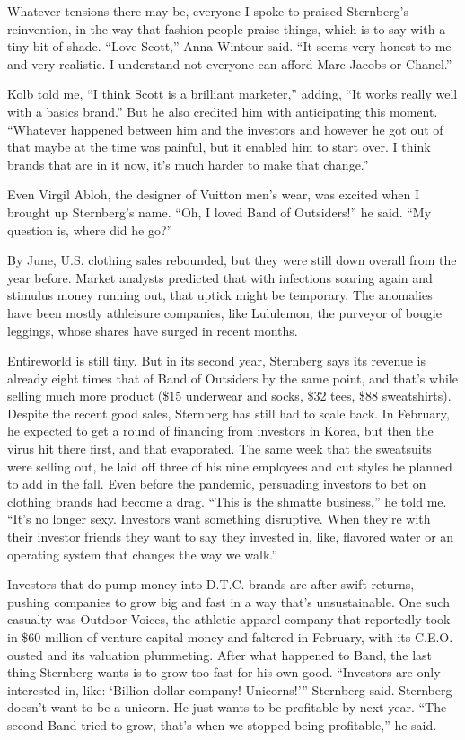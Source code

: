 Whatever tensions there may be, everyone I spoke to praised Sternberg's
reinvention, in the way that fashion people praise things, which is to
say with a tiny bit of shade. ``Love Scott,'' Anna Wintour said. ``It
seems very honest to me and very realistic. I understand not everyone
can afford Marc Jacobs or Chanel.''

Kolb told me, ``I think Scott is a brilliant marketer,'' adding, ``It
works really well with a basics brand.'' But he also credited him with
anticipating this moment. ``Whatever happened between him and the
investors and however he got out of that maybe at the time was painful,
but it enabled him to start over. I think brands that are in it now,
it's much harder to make that change.''

Even Virgil Abloh, the designer of Vuitton men's wear, was excited when
I brought up Sternberg's name. ``Oh, I loved Band of Outsiders!'' he
said. ``My question is, where did he go?''

By June, U.S. clothing sales rebounded, but they were still down overall
from the year before. Market analysts predicted that with infections
soaring again and stimulus money running out, that uptick might be
temporary. The anomalies have been mostly athleisure companies, like
Lululemon, the purveyor of bougie leggings, whose shares have surged in
recent months.

Entireworld is still tiny. But in its second year, Sternberg says its
revenue is already eight times that of Band of Outsiders by the same
point, and that's while selling much more product (\$15 underwear and
socks, \$32 tees, \$88 sweatshirts). Despite the recent good sales,
Sternberg has still had to scale back. In February, he expected to get a
round of financing from investors in Korea, but then the virus hit there
first, and that evaporated. The same week that the sweatsuits were
selling out, he laid off three of his nine employees and cut styles he
planned to add in the fall. Even before the pandemic, persuading
investors to bet on clothing brands had become a drag. ``This is the
shmatte business,'' he told me. ``It's no longer sexy. Investors want
something disruptive. When they're with their investor friends they want
to say they invested in, like, flavored water or an operating system
that changes the way we walk.''

Investors that do pump money into D.T.C. brands are after swift returns,
pushing companies to grow big and fast in a way that's unsustainable.
One such casualty was Outdoor Voices, the athletic-apparel company that
reportedly took in \$60 million of venture-capital money and faltered in
February, with its C.E.O. ousted and its valuation plummeting. After
what happened to Band, the last thing Sternberg wants is to grow too
fast for his own good. ``Investors are only interested in, like:
`Billion-dollar company! Unicorns!''' Sternberg said. Sternberg doesn't
want to be a unicorn. He just wants to be profitable by next year. ``The
second Band tried to grow, that's when we stopped being profitable,'' he
said.

